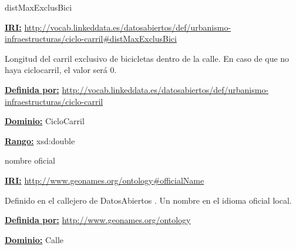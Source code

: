 \begin{mybox}{distMaxExclusBici}
\begin{flushleft}
\underline{\textbf{IRI:}}
\url{http://vocab.linkeddata.es/datosabiertos/def/urbanismo-infraestructuras/ciclo-carril#distMaxExclusBici}
\newline

Longitud del carril exclusivo de bicicletas dentro de la calle.
En caso de que no haya ciclocarril, el valor será 0.
\newline


\underline{\textbf{Definida por:}}
\url{http://vocab.linkeddata.es/datosabiertos/def/urbanismo-infraestructuras/ciclo-carril}
\newline

\underline{\textbf{Dominio:}}
	CicloCarril
\newline

\underline{\textbf{Rango:}}
	xsd:double
\newline

\end{flushleft}
\end{mybox}



\begin{mybox}{nombre oficial}
\begin{flushleft}
\underline{\textbf{IRI:}}
\url{http://www.geonames.org/ontology#officialName}
\newline

Definido en el callejero de DatosAbiertos \cite{ciudadesbiertas_callejero}.
Un nombre en el idioma oficial local.
\newline


\underline{\textbf{Definida por:}}
\url{http://www.geonames.org/ontology}
\newline

\underline{\textbf{Dominio:}}
	Calle
\newline


\end{flushleft}
\end{mybox}







